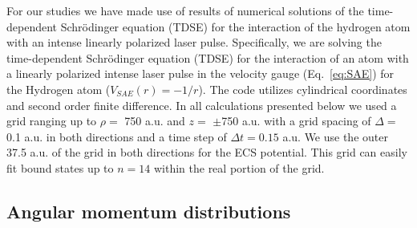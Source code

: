For our studies we have made use of results of numerical solutions of the time-dependent Schr\"odinger equation (TDSE) for the interaction of the hydrogen atom with an intense linearly polarized laser pulse.
Specifically, we are solving the time-dependent Schr\"{o}dinger equation (TDSE) for the interaction of an atom with a linearly polarized intense laser pulse in the velocity gauge (Eq.~\ref{eq:SAE}) for the Hydrogen atom ($V_{SAE}(r)=-1/r$). The code utilizes cylindrical coordinates and second order finite difference. In all calculations presented below we used a grid ranging up to $\rho=$ 750 a.u. and $z=$ $\pm$750 a.u. with a grid spacing of $\Delta =$ 0.1 a.u. in both directions and a time step of $\Delta t = 0.15$ a.u. We use the outer 37.5 a.u. of the grid in both directions for the ECS potential. This grid can easily fit bound states up to $n = 14$ within the real portion of the grid. 

\subsection{Angular momentum distributions}
\label{sub:angularmomentum}

